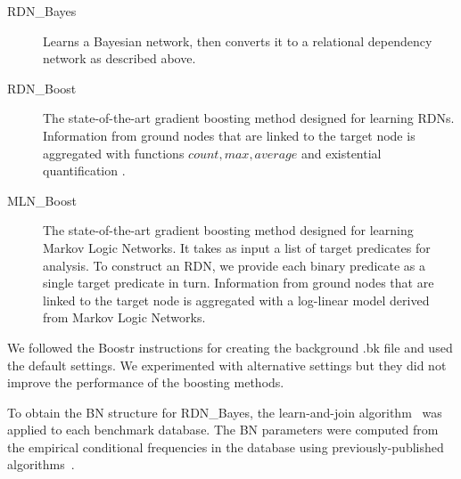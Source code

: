 \documentclass[runningheads,a4paper]{llncs}
\begin{document}
\begin{description}
\item[RDN\_Bayes] Learns a Bayesian network, then converts it to a relational dependency network as described above.
\item[RDN\_Boost] The state-of-the-art gradient boosting method designed for learning RDNs. Information from ground nodes that are linked to the target node is aggregated with functions $count, max, average$ and existential quantification \cite{Natarajan2012}.
\item[MLN\_Boost] The state-of-the-art gradient boosting method designed for learning Markov Logic Networks. It takes as input a  list of target predicates for analysis. To construct an RDN, we provide each binary predicate as a single target predicate in turn. Information from ground nodes that are linked to the target node is aggregated with a log-linear model derived from Markov Logic Networks.
\end{description}
We followed the Boostr instructions for creating the background .bk file and used the default settings. We experimented with alternative settings but they did not improve the performance of the boosting methods.


To obtain the BN structure for RDN\_Bayes, the learn-and-join algorithm~\cite{Schulte2012} was applied to each benchmark database. The BN parameters were computed from the empirical conditional frequencies in the database using previously-published algorithms~\cite{Schulte2014}. 
\end{document}
